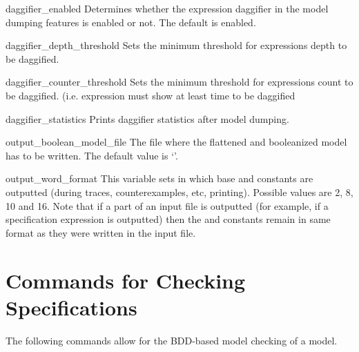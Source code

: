 \begin{nusmvVar} {daggifier\_enabled}{}{}
Determines whether the expression daggifier in the model dumping
features is enabled or not. The default is enabled.
\end{nusmvVar}

\begin{nusmvVar} {daggifier\_depth\_threshold} {} {}
Sets the minimum threshold for expressions depth to be daggified.
\end{nusmvVar}

\begin{nusmvVar} {daggifier\_counter\_threshold} {} {}
Sets the minimum threshold for expressions count to be
daggified. (i.e. expression must show at least  time to
be daggified
\end{nusmvVar}

\begin{nusmvVar} {daggifier\_statistics}{}{}
Prints daggifier statistics after model dumping.
\end{nusmvVar}


\begin{nusmvVar}{output\_boolean\_model\_file}
{}{} 
The file where the flattened and booleanized model has to be written. The
default value is `'.
\end{nusmvVar}

\begin{nusmvVar}{output\_word\_format}{}
{} This variable sets in which base \UWord and \SWord
constants are outputted (during traces, counterexamples, etc,
printing). Possible values are 2, 8, 10 and 16. Note that if a part of
an input file is outputted (for example, if a specification expression
is outputted) then the \UWord and \SWord constants remain in same
format as they were written in the input file.
\end{nusmvVar}

\section{Commands for Checking Specifications}
The following commands allow for the BDD-based model checking of a
\nusmv model.






